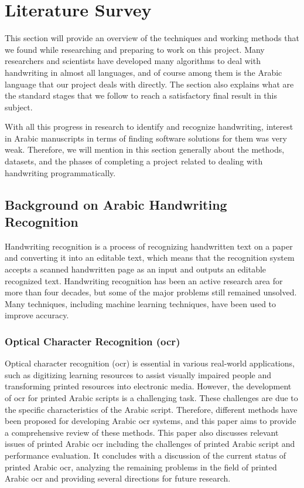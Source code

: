 \chapter{Literature Survey}
\label{ch:literature-survey}

\quad This section will provide an overview of the techniques and working methods that we found while researching and preparing to work on this project. Many researchers and scientists have developed many algorithms to deal with handwriting in almost all languages, and of course among them is the Arabic language that our project deals with directly. The section also explains what are the standard stages that we follow to reach a satisfactory final result in this subject.

With all this progress in research to identify and recognize handwriting, interest in Arabic manuscripts in terms of finding software solutions for them was very weak. Therefore, we will mention in this section generally about the methods, datasets, and the phases of completing a project related to dealing with handwriting programmatically.


\section{Background on Arabic Handwriting Recognition}
Handwriting recognition is a process of recognizing handwritten text on a paper and converting it into an editable text, which means that the recognition system accepts a scanned handwritten page as an input and outputs an editable recognized text. Handwriting recognition has been an active research area for more than four decades, but some of the major problems still remained unsolved. Many techniques, including machine learning techniques, have been used to improve accuracy.

\subsection{Optical Character Recognition (\acrshort{ocr})}
Optical character recognition (\acrshort{ocr}) is essential in various real-world applications, such as digitizing learning resources to assist visually impaired people and transforming printed resources into electronic media. However, the development of \acrshort{ocr} for printed Arabic scripts is a challenging task. These challenges are due to the specific characteristics of the Arabic script. Therefore, different methods have been proposed for developing Arabic \acrshort{ocr} systems, and this paper \cite{Alghamdi2018} aims to provide a comprehensive review of these methods. This paper also discusses relevant issues of printed Arabic \acrshort{ocr} including the challenges of printed Arabic script and performance evaluation. It concludes with a discussion of the current status of printed Arabic \acrshort{ocr}, analyzing the remaining problems in the field of printed Arabic \acrshort{ocr} and providing several directions for future research. \\

